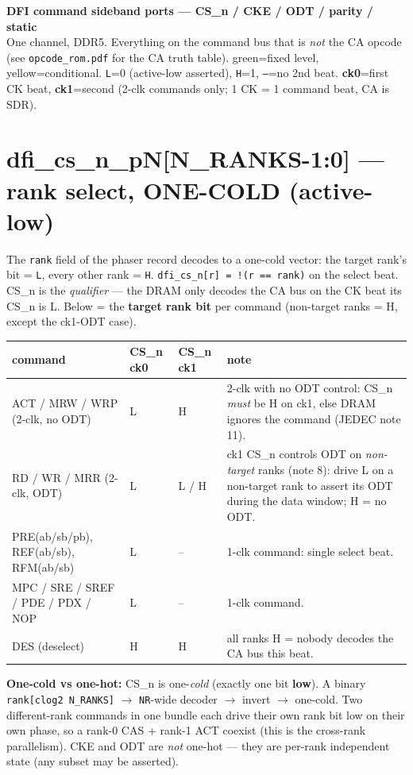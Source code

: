 \documentclass[9pt]{extarticle}
\newcommand{\op}[1]{\cellcolor{opc}#1}
\newcommand{\fd}[1]{\cellcolor{fld}#1}
\begin{document}
\begin{center}
{\LARGE\textbf{DFI command sideband ports --- CS\_n / CKE / ODT / parity / static}}\\[2pt]
{\small One channel, DDR5. Everything on the command bus that is \emph{not} the CA opcode
(see \texttt{opcode\_rom.pdf} for the CA truth table). \colorbox{opc}{green}=fixed level,
\colorbox{fld}{yellow}=conditional. \texttt{L}=0 (active-low asserted), \texttt{H}=1, \texttt{--}=no
2nd beat. \textbf{ck0}=first CK beat, \textbf{ck1}=second (2-clk commands only; 1 CK = 1 command beat,
CA is SDR).}
\end{center}

\section{dfi\_cs\_n\_pN[N\_RANKS-1:0]  ---  rank select, ONE-COLD (active-low)}
{\footnotesize The \texttt{rank} field of the phaser record decodes to a one-cold vector: the target
rank's bit = \texttt{L}, every other rank = \texttt{H}. \texttt{dfi\_cs\_n[r] = !(r == rank)} on the
select beat. CS\_n is the \emph{qualifier} --- the DRAM only decodes the CA bus on the CK beat its
CS\_n is L. Below = the \textbf{target rank bit} per command (non-target ranks = H, except the ck1-ODT case).}

\smallskip
\begin{center}
\begin{tabular}{F A A M}
\toprule
{}\textbf{command} & \textbf{CS\_n ck0} & \textbf{CS\_n ck1} & \textbf{note}\\ \midrule
ACT / MRW / WRP (2-clk, no ODT) & \op{L} & \op{H} & 2-clk with no ODT control: CS\_n \emph{must} be H on ck1, else DRAM ignores the command (JEDEC note 11).\\
RD / WR / MRR (2-clk, ODT) & \op{L} & \fd{L / H} & ck1 CS\_n controls ODT on \emph{non-target} ranks (note 8): drive L on a non-target rank to assert its ODT during the data window; H = no ODT.\\
PRE(ab/sb/pb), REF(ab/sb), RFM(ab/sb) & \op{L} & -- & 1-clk command: single select beat.\\
MPC / SRE / SREF / PDE / PDX / NOP & \op{L} & -- & 1-clk command.\\
DES (deselect) & \op{H} & \op{H} & all ranks H = nobody decodes the CA bus this beat.\\
\bottomrule
\end{tabular}
\end{center}
\smallskip
{\footnotesize \textbf{One-cold vs one-hot:} CS\_n is one-\emph{cold} (exactly one bit \textbf{low}).
A binary \texttt{rank[clog2 N\_RANKS]} $\rightarrow$ \texttt{NR}-wide decoder $\rightarrow$ invert
$\rightarrow$ one-cold. Two different-rank commands in one bundle each drive their own rank bit low on
their own phase, so a rank-0 CAS + rank-1 ACT coexist (this is the cross-rank parallelism). CKE and
ODT are \emph{not} one-hot --- they are per-rank independent state (any subset may be asserted).}
\end{document}
